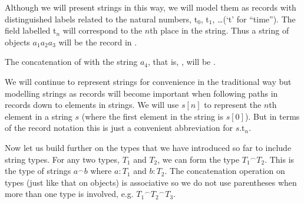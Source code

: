 Although we will present strings in this way, we will model them as
records \label{pg:stringsasrecords} with distinguished labels related to the natural numbers, 
t$_0$, t$_1$, \ldots (`t' for ``time'').  The field labelled t$_n$
will correspond to the $n$th place in the string.  Thus a string of
objects $a_1a_2a_3$
will be the record in \nexteg{}.
\begin{ex} 
\end{ex} 
The concatenation of \preveg{} with the string $a_4$, that is, , will
be .
\begin{ex} 
\begin{subex} 
 
\item {} 
 
\item  {}
 
\end{subex} 
   
\end{ex} 
We will continue to
represent strings for convenience in the traditional way but modelling
strings as records will become important when following paths in
records down to elements in strings.  We will use $s[n]$ to represent
the $n$th element in a string $s$ (where the first element in the
string is $s[0]$).  But in terms of the record notation
this is just a convenient abbreviation for $s$.t$_n$.    

Now let us build further on the
types that we have introduced so far to include string types. For any
two types, $T_1$ and $T_2$, we can form the type ${T_1}^{\frown}T_2$.
This is the type of strings $a^{\frown}b$ where $a:T_1$ and $b:T_2$.
The concatenation operation on types (just like that on objects) is
associative so we do not use parentheses when more than one type is
involved, e.g. ${T_1}^{\frown}{T_2}^{\frown}T_3$.

